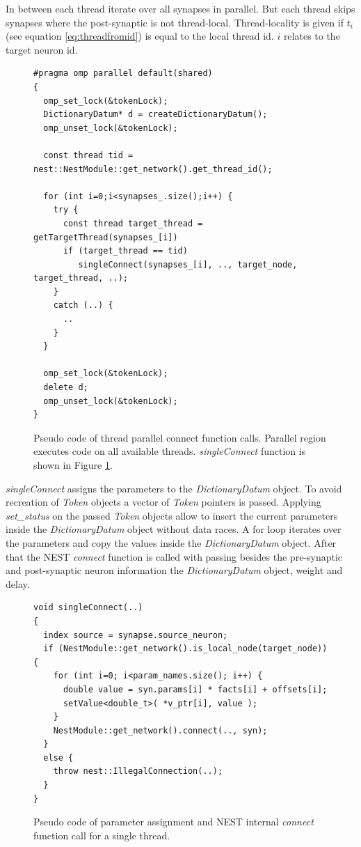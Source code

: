 In between each thread iterate over all synapses in parallel.
But each thread skips synapses where the post-synaptic is not thread-local.
Thread-locality is given if $t_i$ (see equation \ref{eq:threadfromid}) is equal to the local thread id.
$i$ relates to the target neuron id.
\begin{figure}[ht!]
\begin{lstlisting}[style=cppcode]
#pragma omp parallel default(shared)
{ 
  omp_set_lock(&tokenLock);
  DictionaryDatum* d = createDictionaryDatum();  
  omp_unset_lock(&tokenLock);

  const thread tid = nest::NestModule::get_network().get_thread_id();
      
  for (int i=0;i<synapses_.size();i++) {
    try {
      const thread target_thread = getTargetThread(synapses_[i])
      if (target_thread == tid)
	     singleConnect(synapses_[i], .., target_node, target_thread, ..);
    }
    catch (..) {
      ..
    }
  }
  
  omp_set_lock(&tokenLock);
  delete d;  
  omp_unset_lock(&tokenLock);
}
\end{lstlisting}
\caption{Pseudo code of thread parallel connect function calls.
Parallel region executes code on all available threads.
\emph{singleConnect} function is shown in Figure \ref{fig:singleConnect}.
}
\end{figure}
\emph{singleConnect} assigns the parameters to the \emph{DictionaryDatum} object.
To avoid recreation of \emph{Token} objects a vector of  \emph{Token} pointers is
passed. Applying \emph{set\_{}status} on the passed \emph{Token} objects allow to
insert the current parameters inside the \emph{DictionaryDatum} object without data races.
A for loop iterates over the parameters and copy the values inside the \emph{DictionaryDatum} object.
After that the NEST \emph{connect} function is called with passing besides the pre-synaptic and post-synaptic
neuron information the \emph{DictionaryDatum} object, weight and delay.
\begin{figure}[ht!]
\begin{lstlisting}[style=cppcode]
void singleConnect(..)
{
  index source = synapse.source_neuron;
  if (NestModule::get_network().is_local_node(target_node)) { 
    for (int i=0; i<param_names.size(); i++) {
      double value = syn.params[i] * facts[i] + offsets[i];
      setValue<double_t>( *v_ptr[i], value );
    }
    NestModule::get_network().connect(.., syn);
  }
  else {
    throw nest::IllegalConnection(..);
  }
}
\end{lstlisting}
\caption{Pseudo code of parameter assignment and NEST internal \emph{connect} function call for a single thread.}
\label{fig:singleConnect}
\end{figure}


